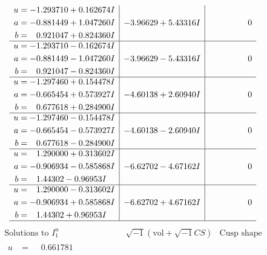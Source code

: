 \documentclass[1p]{elsarticle_modified}
\theoremstyle{definition}
\newcommand{\I}{\sqrt{-1}}
\begin{document}
$$\begin{array}{c|c|c}
\begin{aligned}
u &= -1.293710 + 0.162674 I \\
a &= -0.881449 + 1.047260 I \\
b &= \phantom{-}0.921047 + 0.824360 I\end{aligned}
 & -3.96629 + 5.43316 I & \phantom{-0.000000 } 0 \\ \hline\begin{aligned}
u &= -1.293710 - 0.162674 I \\
a &= -0.881449 - 1.047260 I \\
b &= \phantom{-}0.921047 - 0.824360 I\end{aligned}
 & -3.96629 - 5.43316 I & \phantom{-0.000000 } 0 \\ \hline\begin{aligned}
u &= -1.297460 + 0.154478 I \\
a &= -0.665454 + 0.573927 I \\
b &= \phantom{-}0.677618 + 0.284900 I\end{aligned}
 & -4.60138 + 2.60940 I & \phantom{-0.000000 } 0 \\ \hline\begin{aligned}
u &= -1.297460 - 0.154478 I \\
a &= -0.665454 - 0.573927 I \\
b &= \phantom{-}0.677618 - 0.284900 I\end{aligned}
 & -4.60138 - 2.60940 I & \phantom{-0.000000 } 0 \\ \hline\begin{aligned}
u &= \phantom{-}1.290000 + 0.313602 I \\
a &= -0.906934 - 0.585868 I \\
b &= \phantom{-}1.44302 - 0.96953 I\end{aligned}
 & -6.62702 - 4.67162 I & \phantom{-0.000000 } 0 \\ \hline\begin{aligned}
u &= \phantom{-}1.290000 - 0.313602 I \\
a &= -0.906934 + 0.585868 I \\
b &= \phantom{-}1.44302 + 0.96953 I\end{aligned}
 & -6.62702 + 4.67162 I & \phantom{-0.000000 } 0\\
 \hline 
 \end{array}$$\newpage$$\begin{array}{c|c|c}  
\text{Solutions to }I^u_{1}& \I (\text{vol} + \sqrt{-1}CS) & \text{Cusp shape}\\
 \hline 
\begin{aligned}
u &= \phantom{-}0.661781\phantom{ +0.000000I} \\

\end{aligned}
\end{array}$$
\end{document}
